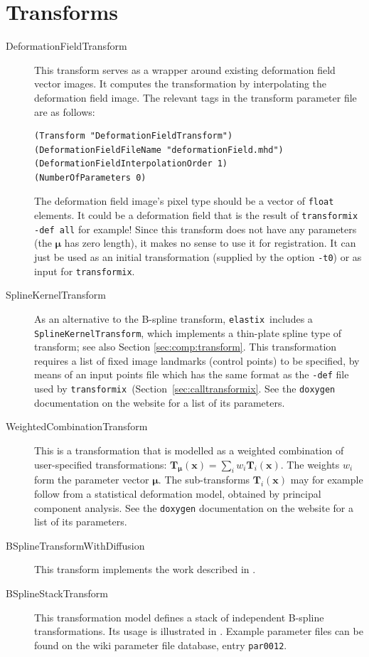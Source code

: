 \documentclass[]{report}
\newcommand{\elastix}{\texttt{elastix}}
\newcommand{\transformix}{\texttt{transformix}}
\newcommand{\vx}{\bm{x}}
\newcommand{\vmu}{\bm{\mu}}
\newcommand{\vT}{\bm{T}}
\newcommand{\vTm}{\bm{T}_{\vmu}}
\begin{document}
\section{Transforms}\label{sec:adv:transform}

\begin{description}
\item[DeformationFieldTransform] This transform serves as a wrapper around
    existing deformation field vector images. It computes the
    transformation by interpolating the deformation field image. The
    relevant tags in the transform parameter file are as follows:
\begin{verbatim}
(Transform "DeformationFieldTransform")
(DeformationFieldFileName "deformationField.mhd")
(DeformationFieldInterpolationOrder 1)
(NumberOfParameters 0)
\end{verbatim}
The deformation field image's pixel type should be a vector of
\texttt{float} elements. It could be a deformation field that is the
result of \texttt{transformix -def all} for example! Since this
transform does not have any parameters (the $\vmu$ has zero length),
it makes no sense to use it for registration. It can just be used as
an initial transformation (supplied by the option \texttt{-t0}) or
as input for \transformix.

\item[SplineKernelTransform] As an alternative to the B-spline transform,
    \elastix\ includes a \texttt{SplineKernelTransform}, which implements a
    thin-plate spline type of transform; see also Section
    \ref{sec:comp:transform}. This transformation requires a list of fixed
    image landmarks (control points) to be specified, by means of an input
    points file which has the same format as the \texttt{-def} file used by
    \transformix\ (Section~\ref{sec:calltransformix}. See the
    \texttt{doxygen} documentation on the website for a list of its
    parameters.

\item[WeightedCombinationTransform] This is a transformation that is
    modelled as a weighted combination of user-specified transformations:
    $\vTm(\vx) = \sum_i w_i \vT_i(\vx)$. The weights $w_i$ form the
    parameter vector $\vmu$. The sub-transforms $\vT_i(\vx)$ may for
    example follow from a statistical deformation model, obtained by
    principal component analysis. See the \texttt{doxygen} documentation on
    the website for a list of its parameters.

\item[BSplineTransformWithDiffusion] This transform implements the work
    described in \cite{Staring07a}.

\item[BSplineStackTransform] This transformation model defines a stack of
    independent B-spline transformations. Its usage is illustrated in
    \cite{Metz10}. Example parameter files can be found on the wiki
    parameter file database, entry \texttt{par0012}.
\end{description}
\end{document}

